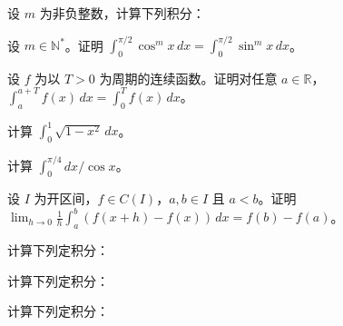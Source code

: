 \newpage
\noindent\begin{minipage}{\textwidth}
设 $m$ 为非负整数，计算下列积分：
\end{minipage}\par\vfill
\noindent\begin{minipage}{\textwidth}
设 $m\in\mathbb N^*$。证明 $\int_0^{\pi/2}\cos^m x\,dx=\int_0^{\pi/2}\sin^m x\,dx$。
\end{minipage}\par\vfill
\noindent\begin{minipage}{\textwidth}
设 $f$ 为以 $T>0$ 为周期的连续函数。证明对任意 $a\in\mathbb R$，$\int_a^{a+T}f(x)\,dx=\int_0^T f(x)\,dx$。
\end{minipage}\par\vfill
\newpage
\noindent\begin{minipage}{\textwidth}
计算 $\int_0^1\sqrt{1-x^2}\,dx$。
\end{minipage}\par\vfill
\noindent\begin{minipage}{\textwidth}
计算 $\int_0^{\pi/4}dx/\cos x$。
\end{minipage}\par\vfill
\noindent\begin{minipage}{\textwidth}
设 $I$ 为开区间，$f\in C(I)$，$a,b\in I$ 且 $a<b$。证明 $\lim_{h\to0}\frac1h\int_a^b(f(x+h)-f(x))\,dx=f(b)-f(a)$。
\end{minipage}\par\vfill
\newpage
\noindent\begin{minipage}{\textwidth}
计算下列定积分：
\end{minipage}\par\vfill
\noindent\begin{minipage}{\textwidth}
计算下列定积分：
\end{minipage}\par\vfill
\noindent\begin{minipage}{\textwidth}
计算下列定积分：
\end{minipage}\par\vfill

